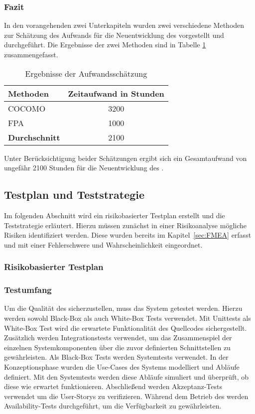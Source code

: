 \subsubsection{Fazit}
In den vorangehenden zwei Unterkapiteln wurden zwei verschiedene Methoden zur Schätzung des Aufwands für die Neuentwicklung des  vorgestellt und durchgeführt.
Die Ergebnisse der zwei Methoden sind in Tabelle \ref{tab:aufwandsschaetzungErgebnisse} zusammengefasst.
\begin{table}[H]
  \centering
  \begin{tabular}{|l|c|}
    \hline
    \textbf{Methoden} & \textbf{Zeitaufwand} in Stunden \\
    \hline
    \ac{COCOMO} & 3200 \\
    \hline
    \ac{FPA} & 1000 \\
    \hline
    \textbf{Durchschnitt} & 2100 \\
    \hline
  \end{tabular}
  \caption{Ergebnisse der Aufwandsschätzung}
  \label{tab:aufwandsschaetzungErgebnisse}
\end{table}

\noindent{}Unter Berücksichtigung beider Schätzungen ergibt sich ein Gesamtaufwand von ungefähr 2100 Stunden für die Neuentwicklung des .

\subsection{Testplan und Teststrategie}
Im folgenden Abschnitt wird ein risikobasierter Testplan erstellt und die Teststrategie erläutert.
Hierzu müssen zunächst in einer Risikoanalyse mögliche Risiken identifiziert werden.
Diese wurden bereits im Kapitel~\ref{sec:FMEA} erfasst und mit einer Fehlerschwere und Wahrscheinlichkeit eingeordnet.
\subsubsection{Risikobasierter Testplan}
\subsubsection*{Testumfang}
Um die Qualität des  sicherzustellen, muss das System getestet werden.
Hierzu werden sowohl Black-Box als auch White-Box Tests verwendet.
Mit Unittests als White-Box Test wird die erwartete Funktionalität des Quellcodes sichergestellt.
Zusätzlich werden Integrationstests verwendet, um das Zusammenspiel der einzelnen Systemkomponenten über die zuvor definierten Schnittstellen zu gewährleisten.
\newparagraph
Als Black-Box Tests werden Systemtests verwendet.
In der Konzeptionsphase wurden die Use-Cases des Systems modelliert und Abläufe definiert.
Mit den Systemtests werden diese Abläufe simuliert und überprüft, ob diese wie erwartet funktionieren.
Abschließend werden Akzeptanz-Tests verwendet um die User-Storys zu verifizieren.
Während dem Betrieb des  werden Availability-Tests durchgeführt, um die Verfügbarkeit zu gewährleisten.

